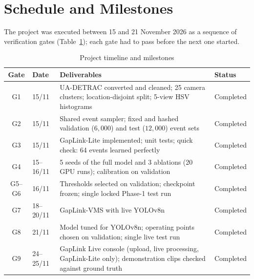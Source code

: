 \section{Schedule and Milestones}
\label{sec:schedule_milestones}

The project was executed between 15 and 21 November 2026 as a sequence of verification gates (Table~\ref{tab:milestones}); each gate had to pass before the next one started.

\begin{table}[H]
    \centering
    \caption{Project timeline and milestones}
    \label{tab:milestones}
    \small
    \begin{tabularx}{\textwidth}{c p{1.6cm} X p{1.9cm}}
        \toprule
        \textbf{Gate} & \textbf{Date} & \textbf{Deliverables} & \textbf{Status} \\
        \midrule
        G1 & 15/11 & UA-DETRAC converted and cleaned; 25 camera clusters; location-disjoint split; 5-view HSV histograms & Completed \\
        G2 & 15/11 & Shared event sampler; fixed and hashed validation ($6{,}000$) and test ($12{,}000$) event sets & Completed \\
        G3 & 15/11 & GapLink-Lite implemented; unit tests; quick check: 64 events learned perfectly & Completed \\
        G4 & 15--16/11 & 5 seeds of the full model and 3 ablations (20 GPU runs); calibration on validation & Completed \\
        G5--G6 & 16/11 & Thresholds selected on validation; checkpoint frozen; single locked Phase-1 test run & Completed \\
        G7 & 18--20/11 & GapLink-VMS with live YOLOv8n & Completed \\
        G8 & 21/11 & Model tuned for YOLOv8n; operating points chosen on validation; single live test run & Completed \\
        G9 & 24--25/11 & GapLink Live console (upload, live processing, GapLink-Lite only); demonstration clips checked against ground truth & Completed \\
        \bottomrule
    \end{tabularx}
\end{table}
